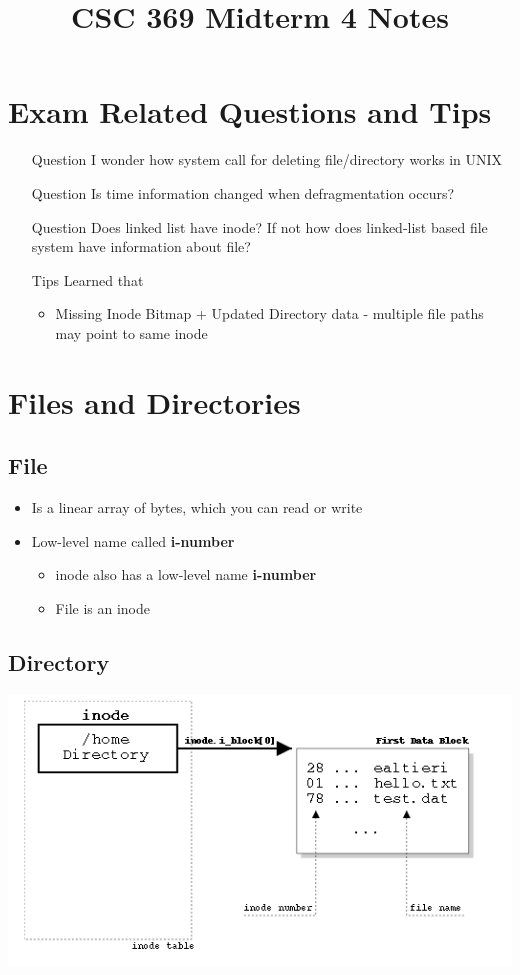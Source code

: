 \documentclass[12pt]{article}
\begin{document}
\title{CSC 369 Midterm 4 Notes}

\section{Exam Related Questions and Tips}

\begin{itemize}
    \item [\color{blue}Question\color{black}] I wonder how system call for deleting file/directory works in UNIX
    \item [\color{blue}Question\color{black}] Is time information changed when defragmentation occurs?
    \item [\color{blue}Question\color{black}] Does linked list have inode? If not how does linked-list based file system
    have information about file?
    \item [\color{green}Tips\color{black}] Learned that
    \begin{itemize}
        \item Missing Inode Bitmap + Updated Directory data - multiple file paths may point to same inode
    \end{itemize}
\end{itemize}

\section{Files and Directories}
\subsection{File}
\begin{itemize}
    \item Is a linear array of bytes, which you can read or write
    \item Low-level name called \textbf{i-number}
    \begin{itemize}
        \item inode also has a low-level name \textbf{i-number}
        \item File is an inode
    \end{itemize}
\end{itemize}

\subsection{Directory}

\begin{center}
\includegraphics[width=0.8\linewidth]{../images/midterm_4_solution_53.png}
\end{center}
\end{document}
